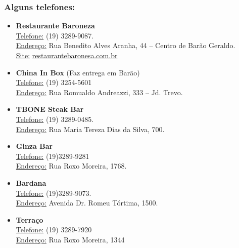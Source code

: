 \subsubsection{Alguns telefones:}

\begin{itemize}
\item  \textbf{Restaurante Baroneza}
\\\underline{Telefone:} (19) 3289-9087.
\\\underline{Endereço:} Rua Benedito Alves Aranha, 44 -- Centro de Barão Geraldo.
\\\underline{Site:} \url{restaurantebaronesa.com.br}
\end{itemize}

\begin{itemize}
\item  \textbf{China In Box} (Faz entrega em Barão)
\\\underline{Telefone:} (19) 3254-5601
\\\underline{Endereço:} Rua Romualdo Andreazzi, 333 -- Jd. Trevo.
\end{itemize}

\begin{itemize}
\item  \textbf{TBONE Steak Bar}
\\\underline{Telefone:} (19) 3289-0485.
\\\underline{Endereço:} Rua Maria Tereza Dias da Silva, 700.
\end{itemize}

\begin{itemize}
\item  \textbf{Ginza Bar}
\\\underline{Telefone:} (19)3289-9281
\\\underline{Endereço:} Rua Roxo Moreira, 1768.
\end{itemize}

\begin{itemize}
\item  \textbf{Bardana}
\\\underline{Telefone:} (19)3289-9073.
\\\underline{Endereço:} Avenida Dr. Romeu Tórtima, 1500.
\end{itemize}

\begin{itemize}
\item  \textbf{Terraço}
\\\underline{Telefone:} (19) 3289-7920
\\\underline{Endereço:} Rua Roxo Moreira, 1344
\end{itemize}

